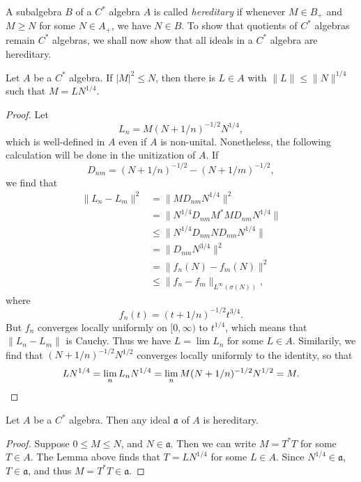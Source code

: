 A subalgebra $B$ of a $C^*$ algebra $A$ is called \emph{hereditary} if whenever $M \in B_+$ and $M \geq N$ for some $N \in A_+$, we have $N \in B$. To show that quotients of $C^*$ algebras remain $C^*$ algebras, we shall now show that all ideals in a $C^*$ algebra are hereditary.

\begin{lemma}
    Let $A$ be a $C^*$ algebra. If $|M|^2 \leq N$, then there is $L \in A$ with $\| L \| \leq \| N \|^{1/4}$ such that $M = LN^{1/4}$.
\end{lemma}
\begin{proof}
    Let
    \[ L_n = M(N + 1/n)^{-1/2} N^{1/4}, \]
    which is well-defined in $A$ even if $A$ is non-unital. Nonetheless, the following calculation will be done in the unitization of $A$. If
    \[ D_{nm} = (N + 1/n)^{-1/2} - (N + 1/m)^{-1/2}, \]
    we find that
    \begin{align*}
        \| L_n - L_m \|^2 &= \| M D_{nm} N^{1/4} \|^2\\
        &= \| N^{1/4} D_{nm} M^* M D_{nm} N^{1/4} \|\\
        &\leq \| N^{1/4} D_{nm} N D_{nm} N^{1/4} \|\\
        &= \| D_{nm} N^{3/4} \|^2\\
        &= \| f_n(N) - f_m(N) \|^2\\
        &\leq \| f_n - f_m \|_{L^\infty(\sigma(N))},
    \end{align*}
    where
    \[ f_n(t) = (t + 1/n)^{-1/2} t^{3/4}. \]
    But $f_n$ converges locally uniformly on $[0,\infty)$ to $t^{1/4}$, which means that $\| L_n - L_m \|$ is Cauchy. Thus we have $L = \lim L_n$ for some $L \in A$. Similarily, we find that $(N + 1/n)^{-1/2} N^{1/2}$ converges locally uniformly to the identity, so that
    \[ LN^{1/4} = \lim_n L_n N^{1/4} = \lim_n M (N + 1/n)^{-1/2} N^{1/2} = M. \qedhere \]
\end{proof}

\begin{theorem}
    Let $A$ be a $C^*$ algebra. Then any ideal $\mathfrak{a}$ of $A$ is hereditary.
\end{theorem}
\begin{proof}
    Suppose $0 \leq M \leq N$, and $N \in \mathfrak{a}$. Then we can write $M = T^*T$ for some $T \in A$. The Lemma above finds that $T = LN^{1/4}$ for some $L \in A$. Since $N^{1/4} \in \mathfrak{a}$, $T \in \mathfrak{a}$, and thus $M = T^*T \in \mathfrak{a}$.
\end{proof}

